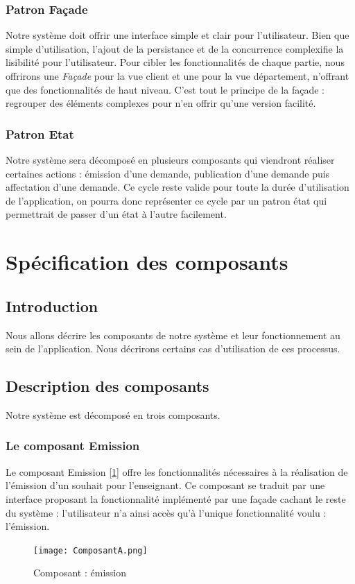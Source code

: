 \documentclass[a4paper,11pt]{article}
\begin{document}
\subsubsection{Patron Façade}
Notre système doit offrir une interface simple et clair pour l'utilisateur. Bien que simple d'utilisation, l'ajout de la persistance et de la concurrence complexifie la lisibilité pour l'utilisateur. Pour cibler les fonctionnalités de chaque partie, nous offrirons une \textit{Façade} pour la vue client et une pour la vue département, n'offrant que des fonctionnalités de haut niveau. C'est tout le principe de la façade : regrouper des éléments complexes pour n'en offrir qu'une version facilité.
\subsubsection{Patron Etat}
Notre système sera décomposé en plusieurs composants qui viendront réaliser certaines actions : émission d'une demande, publication d'une demande puis affectation d'une demande. Ce cycle reste valide pour toute la durée d'utilisation de l'application, on pourra donc représenter ce cycle par un patron état qui permettrait de passer d'un état à l'autre facilement.


\section{Spécification des composants}
\subsection{Introduction}
Nous allons décrire les composants de notre système et leur fonctionnement au sein de l'application. Nous décrirons certains cas d'utilisation de ces processus.

\subsection{Description des composants}
Notre système est décomposé en trois composants.
\subsubsection{Le composant Emission}
Le composant Emission [\ref{DSUC1}] offre les fonctionnalités nécessaires à la réalisation de l'émission d'un souhait pour l'enseignant. Ce composant se traduit par une interface proposant la fonctionnalité implémenté par une façade cachant le reste du système : l'utilisateur n'a ainsi accès qu'à l'unique fonctionnalité voulu : l'émission.
\begin{figure}[ht]
\centering
\texttt{[image: ComposantA.png]}
\caption{Composant : émission}
\label{DSUC1}
\end{figure}
\end{document}
